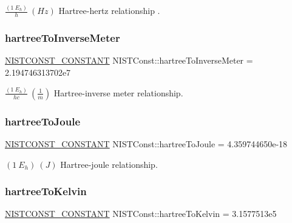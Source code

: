 $\frac{(1\ E_h)}{h} \ (Hz)$ Hartree-\/hertz relationship . \mbox{\label{group___n_i_s_t_const-_hartree_ga7b651bbca9217e235a1276cfdaac9d6e}} 
\subsubsection{\texorpdfstring{hartree\+To\+Inverse\+Meter}{hartreeToInverseMeter}}
{\footnotesize\ttfamily \mbox{\hyperlink{group___n_i_s_t_const-_macros_ga2b0fc1d7452373f816175dd86ce26729}{N\+I\+S\+T\+C\+O\+N\+S\+T\+\_\+\+C\+O\+N\+S\+T\+A\+NT}} N\+I\+S\+T\+Const\+::hartree\+To\+Inverse\+Meter = 2.\+194746313702e7}

$\frac{(1\ E_h)}{hc} \ (\frac{1}{m})$ Hartree-\/inverse meter relationship. \mbox{\label{group___n_i_s_t_const-_hartree_ga477b51b8a0e743da7b56031105b4dd38}} 
\subsubsection{\texorpdfstring{hartree\+To\+Joule}{hartreeToJoule}}
{\footnotesize\ttfamily \mbox{\hyperlink{group___n_i_s_t_const-_macros_ga2b0fc1d7452373f816175dd86ce26729}{N\+I\+S\+T\+C\+O\+N\+S\+T\+\_\+\+C\+O\+N\+S\+T\+A\+NT}} N\+I\+S\+T\+Const\+::hartree\+To\+Joule = 4.\+359744650e-\/18}

$(1\ E_h) \ (J)$ Hartree-\/joule relationship. \mbox{\label{group___n_i_s_t_const-_hartree_ga11349ff8dc3b4b39764521c290d59ec1}} 
\subsubsection{\texorpdfstring{hartree\+To\+Kelvin}{hartreeToKelvin}}
{\footnotesize\ttfamily \mbox{\hyperlink{group___n_i_s_t_const-_macros_ga2b0fc1d7452373f816175dd86ce26729}{N\+I\+S\+T\+C\+O\+N\+S\+T\+\_\+\+C\+O\+N\+S\+T\+A\+NT}} N\+I\+S\+T\+Const\+::hartree\+To\+Kelvin = 3.\+1577513e5}

